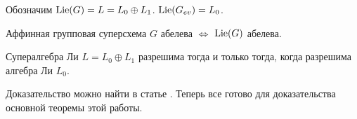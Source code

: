 \begin{lemma}\label{Lie(Gev) = L_0}
  Обозначим $ \mathrm{Lie}(G) = L = L_0 \oplus L_1 $. $ \mathrm{Lie}(G_{ev}) = L_0 $.
\end{lemma}

\begin{lemma} \label{abelian G and Lie(G)}
  Аффинная групповая суперсхема $ G $ абелева $ \iff $ $ \mathrm{Lie}(G) $ абелева.
\end{lemma}

\begin{theorem}[Кац] \label{kac}
  Супералгебра Ли $ L = L_0 \oplus L_1 $ разрешима тогда и только тогда,
  когда разрешима алгебра Ли $ L_0 $.
\end{theorem}
Доказательство можно найти в статье \cite{kac}. Теперь все готово
для доказательства основной теоремы этой работы.

